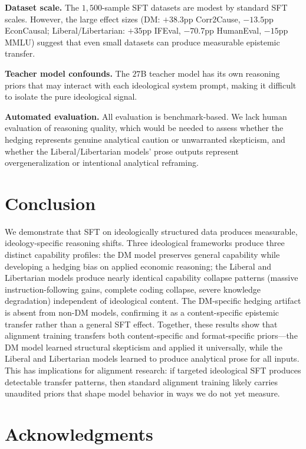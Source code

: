 \documentclass[11pt]{article}
\begin{document}
\textbf{Dataset scale.} The $1{,}500$-sample SFT datasets are modest by standard SFT scales. However, the large effect sizes (DM: $+38.3$pp Corr2Cause, $-13.5$pp EconCausal; Liberal/Libertarian: $+35$pp IFEval, $-70.7$pp HumanEval, $-15$pp MMLU) suggest that even small datasets can produce measurable epistemic transfer.

\textbf{Teacher model confounds.} The $27$B teacher model has its own reasoning priors that may interact with each ideological system prompt, making it difficult to isolate the pure ideological signal.

\textbf{Automated evaluation.} All evaluation is benchmark-based. We lack human evaluation of reasoning quality, which would be needed to assess whether the hedging represents genuine analytical caution or unwarranted skepticism, and whether the Liberal/Libertarian models' prose outputs represent overgeneralization or intentional analytical reframing.

\section{Conclusion}

We demonstrate that SFT on ideologically structured data produces measurable, ideology-specific reasoning shifts. Three ideological frameworks produce three distinct capability profiles: the DM model preserves general capability while developing a hedging bias on applied economic reasoning; the Liberal and Libertarian models produce nearly identical capability collapse patterns (massive instruction-following gains, complete coding collapse, severe knowledge degradation) independent of ideological content. The DM-specific hedging artifact is absent from non-DM models, confirming it as a content-specific epistemic transfer rather than a general SFT effect. Together, these results show that alignment training transfers both content-specific and format-specific priors---the DM model learned structural skepticism and applied it universally, while the Liberal and Libertarian models learned to produce analytical prose for all inputs. This has implications for alignment research: if targeted ideological SFT produces detectable transfer patterns, then standard alignment training likely carries unaudited priors that shape model behavior in ways we do not yet measure.

\section*{Acknowledgments}
\end{document}
